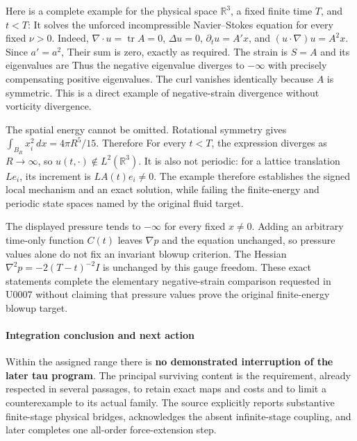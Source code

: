 Here is a complete example for the physical space \(\mathbb R^3\), a
fixed finite time \(T\), and \(t<T\):   It solves the unforced incompressible Navier--Stokes equation for
every fixed \(\nu>0\). Indeed, \(\nabla\cdot u=\operatorname{tr}A=0\),
\(\Delta u=0\), \(\partial_tu=A'x\), and \((u\cdot\nabla)u=A^2x\). Since
\(a'=a^2\),  Their sum is zero, exactly as required. The strain is \(S=A\) and its
eigenvalues are  Thus the negative eigenvalue diverges to \(-\infty\) with precisely
compensating positive eigenvalues. The curl vanishes identically because
\(A\) is symmetric. This is a direct example of negative-strain
divergence without vorticity divergence.

The spatial energy cannot be omitted. Rotational symmetry gives
\(\int_{B_R}x_i^2\,dx=4\pi R^5/15\). Therefore  For every \(t<T\), the expression diverges as \(R\to\infty\), so
\(u(t,\cdot)\notin L^2(\mathbb R^3)\). It is also not periodic: for a
lattice translation \(Le_i\), its increment is \(LA(t)e_i\ne0\). The
example therefore establishes the signed local mechanism and an exact
solution, while failing the finite-energy and periodic state spaces
named by the original fluid target.

The displayed pressure tends to \(-\infty\) for every fixed \(x\ne0\).
Adding an arbitrary time-only function \(C(t)\) leaves \(\nabla p\) and
the equation unchanged, so pressure values alone do not fix an invariant
blowup criterion. The Hessian \(\nabla^2p=-2(T-t)^{-2}I\) is unchanged
by this gauge freedom. These exact statements complete the elementary
negative-strain comparison requested in U0007 without claiming that
pressure values prove the original finite-energy blowup target.

\paragraph{Integration conclusion and next
action}\label{integration-conclusion-and-next-action}

Within the assigned range there is \textbf{no demonstrated interruption
of the later tau program}. The principal surviving content is the
requirement, already respected in several passages, to retain exact maps
and costs and to limit a counterexample to its actual family. The source
explicitly reports substantive finite-stage physical bridges,
acknowledges the absent infinite-stage coupling, and later completes one
all-order force-extension step.

